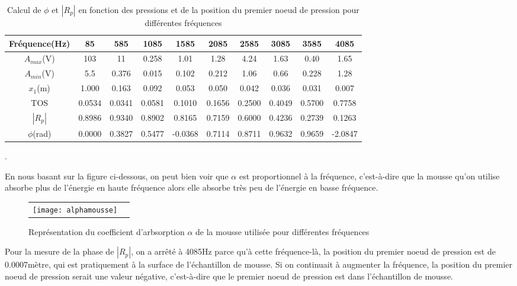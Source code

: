 \documentclass[a4paper,11pt]{article}
\begin{document}
\begin{table}[!hbp]
\begin{adjustwidth}{-2cm}{-1cm}
\begin{tabular}{|c|c|c|c|c|c|c|c|c|c|}
\hline
Fréquence(Hz) & 85 & 585 & 1085 & 1585 & 2085 & 2585 & 3085 & 3585 & 4085\\
\hline 
$A_{max}$(V) & 103 & 11 & 0.258 & 1.01 & 1.28 & 4.24 & 1.63 & 0.40 & 1.65\\
\hline
$A_{min}$(V) & 5.5 & 0.376 & 0.015 & 0.102 & 0.212 & 1.06 & 0.66 & 0.228 & 1.28\\
\hline
$x_{1}$(m) & 1.000 & 0.163 & 0.092 & 0.053 & 0.050 & 0.042 & 0.036 & 0.031 & 0.007\\
\hline
TOS & 0.0534 & 0.0341 & 0.0581 & 0.1010 & 0.1656 & 0.2500 & 0.4049 & 0.5700 & 0.7758\\
\hline
$|R_{p}|$ & 0.8986 & 0.9340 & 0.8902 & 0.8165 & 0.7159 &0.6000 & 0.4236 & 0.2739 & 0.1263\\
\hline
$\phi$(rad) & 0.0000 & 0.3827 & 0.5477 & -0.0368 & 0.7114 & 0.8711 & 0.9632 & 0.9659 & -2.0847\\
\hline
\end{tabular}
\caption{Calcul de $\phi$ et $|R_{p}|$ en fonction des pressions et de la position du premier noeud de pression pour différentes fréquences}
\end{adjustwidth}
\end{table}
.
\newpage

En nous basant sur la figure ci-dessous, on peut bien voir que $\alpha$ est proportionnel à la fréquence, c'est-à-dire que la mousse qu'on utilise absorbe plus de l'énergie en haute fréquence alors elle absorbe très peu de l'énergie en basse fréquence.

\begin{figure}[h]
\centering
\begin{tabular}{cc}
 \texttt{[image: alphamousse]}\\
\end{tabular}
\caption{Représentation du coefficient d'arbsorption $\alpha$ de la mousse utilisée pour différentes fréquences}
\end{figure}


Pour la mesure de la phase de $|R_{p}|$, on a arrêté à 4085Hz parce qu'à cette fréquence-là, la position du premier noeud de pression est de 0.0007mètre, qui est pratiquement à la surface de l'échantillon de mousse. Si on continuait à augmenter la fréquence, la position du premier noeud de pression serait une valeur négative, c'est-à-dire que le premier noeud de pression est dans l'échantillon de mousse. 
\end{document}
